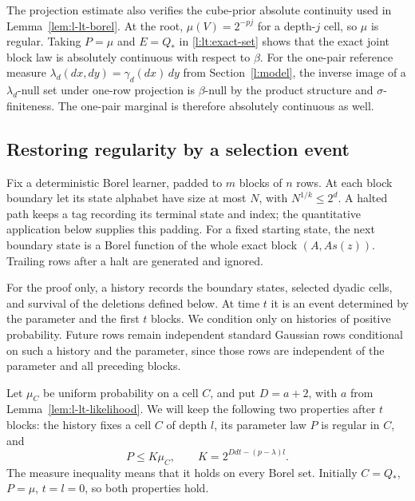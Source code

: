 \begin{remark}
The projection estimate also verifies the cube-prior absolute
continuity used in Lemma~\ref{lem:l-lt-borel}.  At the root,
$\mu(V)=2^{-pj}$ for a depth-$j$ cell, so $\mu$ is regular.
Taking $P=\mu$ and $E=Q_*$ in \eqref{l:lt:exact-set} shows that the
exact joint block law is absolutely continuous with respect to
$\beta$.  For the one-pair reference measure
$\lambda_d(dx,dy)=\gamma_d(dx)\,dy$ from Section~\ref{l:model},
the inverse image of a $\lambda_d$-null set under one-row projection
is $\beta$-null by the product structure and $\sigma$-finiteness.
The one-pair marginal is therefore absolutely continuous as well.
\end{remark}

\subsection{Restoring regularity by a selection event}
\label{subsec:l-lt-selection}

Fix a deterministic Borel learner, padded to $m$ blocks of $n$ rows.
At each block boundary let its state alphabet have size at most $N$,
with $N^{1/k}\le2^d$.  A halted path keeps a tag recording its terminal
state and index; the quantitative application below supplies this
padding.  For a fixed starting state, the next boundary state is a
Borel function of the whole exact block $(A,As(z))$.  Trailing rows
after a halt are generated and ignored.

For the proof only, a history records the boundary states, selected
dyadic cells, and survival of the deletions defined below.  At time
$t$ it is an event determined by the parameter and the first $t$
blocks.  We condition only on histories of positive probability.
Future rows remain independent standard Gaussian rows conditional on
such a history and the parameter, since those rows are independent of
the parameter and all preceding blocks.

Let $\mu_C$ be uniform probability on a cell $C$, and put
$D=a+2$, with $a$ from Lemma~\ref{lem:l-lt-likelihood}.  We will keep
the following two properties after $t$ blocks: the history fixes a
cell $C$ of depth $l$, its parameter law $P$ is regular in $C$, and
\begin{equation}\label{l:lt:density-depth}
 P\le K\mu_C,\qquad K=2^{Ddt-(p-\lambda)l}.
\end{equation}
The measure inequality means that it holds on every Borel set.
Initially $C=Q_*$, $P=\mu$, $t=l=0$, so both properties hold.

